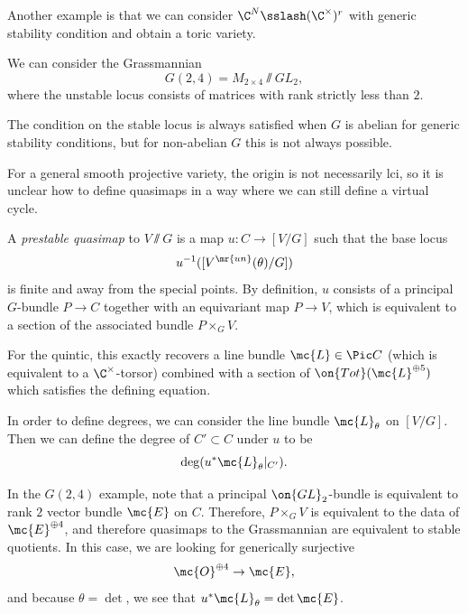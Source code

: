 \begin{exm}
    Another example is that we can consider \(\C^N \sslash (\C^{\times})^r\) with generic stability condition and obtain a toric variety.
\end{exm}

\begin{exm}
    We can consider the Grassmannian
    \[ G(2,4) = M_{2\times 4} \sslash GL_2, \]
    where the unstable locus consists of matrices with rank strictly less than \(2\).
\end{exm}

\begin{rmk}
    The condition on the stable locus is always satisfied when \(G\) is abelian for generic stability conditions, but for non-abelian \(G\) this is not always possible.
\end{rmk}

\begin{rmk}
    For a general smooth projective variety, the origin is not necessarily lci, so it is unclear how to define quasimaps in a way where we can still define a virtual cycle.
\end{rmk}

\begin{defn}
    A \textit{prestable quasimap} to \(V \sslash G\) is a map \(u \colon C \to [V/G]\) such that the base locus
    \[ u^{-1}([V^{\mr{un}}(\theta) / G]) \]
    is finite and away from the special points. By definition, \(u\) consists of a principal \(G\)-bundle \(P \to C\) together with an equivariant map \(P \to V\), which is equivalent to a section of the associated bundle \(P \times_G V\). 
\end{defn}

\begin{exm}
    For the quintic, this exactly recovers a line bundle \(\mc{L} \in \Pic C\) (which is equivalent to a \(\C^{\times}\)-torsor) combined with a section of \(\on{Tot}(\mc{L}^{\oplus 5})\) which satisfies the defining equation.
\end{exm}

In order to define degrees, we can consider the line bundle \(\mc{L}_{\theta}\) on \([V/G]\). Then we can define the degree of \(C' \subset C\) under \(u\) to be
\[ \deg (u^* \mc{L}_{\theta}|_{C'}). \]

\begin{exm}
    In the \(G(2,4)\) example, note that a principal \(\on{GL}_2\)-bundle is equivalent to rank \(2\) vector bundle \(\mc{E}\) on \(C\). Therefore, \(P \times_G V\) is equivalent to the data of \(\mc{E}^{\oplus 4}\), and therefore quasimaps to the Grassmannian are equivalent to stable quotients. In this case, we are looking for generically surjective
    \[ \mc{O}^{\oplus 4} \to \mc{E}, \]
    and because \(\theta = \det\), we see that \(u^* \mc{L}_{\theta} = \det \mc{E}\).
\end{exm}

